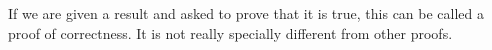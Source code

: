 If we are given a result and asked to prove that it is true, this can
be called a proof of correctness. It is not really specially different
from other proofs.